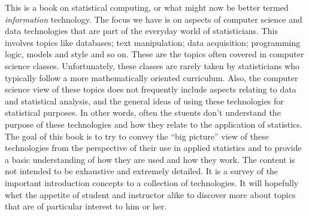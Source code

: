 
This is a book on statistical computing, or what might now be better
termed \textit{information} technology.  The focus we have is on
aspects of computer science and data technologies that are part of the
everyday world of statisticians.  This involves topics like databases;
text manipulation; data acquisition; programming logic, models and
style and so on.  These are the topics often covered in computer
science classes.  Unfortunately, these classes are rarely taken by
statisticians who typically follow a more mathematically oriented
curriculum.  Also, the computer science view of these topics does not
frequently include aspects relating to data and statistical analysis,
and the general ideas of using these technologies for statistical
purposes.  In other words, often the stuents don't understand the
purpose of these technologies and how they relate to the application
of statistics.  The goal of this book is to try to convey the ``big
picture'' view of these technologies from the perspective of their use
in applied statistics and to provide a basic understanding of how they
are used and how they work.  The content is not intended to be
exhaustive and extremely detailed.  It is a survey of the important
introduction concepts to a collection of technologies.  It will
hopefully whet the appetite of student and instructor alike to
discover more about topics that are of particular interest to him or
her.

